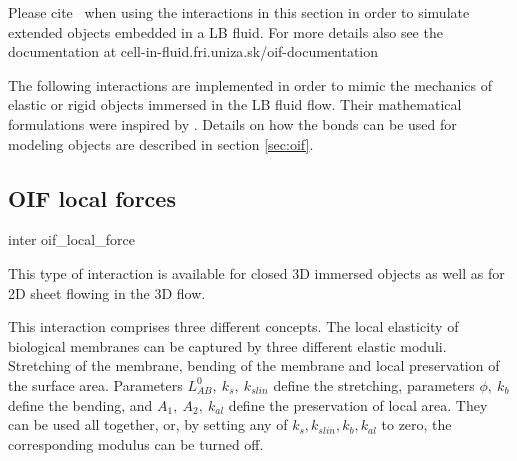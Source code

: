 \begin{citebox}
  Please cite~ when using the interactions
  in this section in order to simulate extended objects embedded in a
  LB fluid. For more details also see the documentation at cell-in-fluid.fri.uniza.sk/oif-documentation
\end{citebox}

The following interactions are implemented in order to mimic the mechanics of 
elastic or rigid objects immersed in the LB fluid flow. Their mathematical formulations 
were inspired by \cite{dupin07}. Details on how the bonds 
can be used for modeling objects are described in section \ref{sec:oif}.

\subsection{OIF local forces}
\begin{essyntax}
  inter 
  oif_local_force
     \var{\phi}      
     \begin{features}
  \end{features}
\end{essyntax}
This type of interaction is available for closed 3D immersed objects as well as 
for 2D sheet flowing in the 3D flow. 

This interaction comprises three different concepts. The local elasticity of biological membranes can be captured by three different elastic moduli. Stretching of the membrane, bending of the membrane and local preservation of the surface area. Parameters ${L^0_{AB}},\ {k_s},\ {k_{slin}}$ define the stretching, parameters $\phi,\ k_b$ define the bending, and $A_1,\ A_2,\ k_{al}$ define the preservation of local area. They can be used all together, or, by setting any of $k_s, k_{slin}, k_b, k_{al}$ to zero, the corresponding modulus can be turned off.

